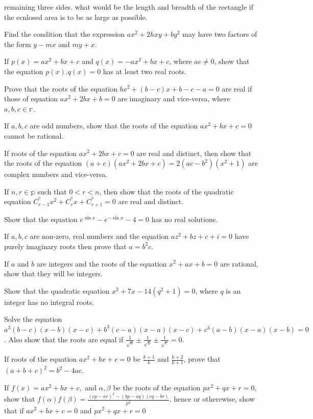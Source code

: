   remaining three sides. what would be the length and breadth of the rectangle if the ecnlosed area is to be as large as possible.
\item Find the condition that the expression $ax^2 + 2hxy + by^2$ may have two factors of the form $y - mx$ and $my + x$.
\item If $p(x) = ax^2 + bx + c$ and $q(x) = - ax^2 + bx + c$, where $ac\neq 0$, show that the equation $p(x).q(x) = 0$ has at least
  two real roots.
\item Prove that the roots of the equation $bx^2 + (b - c)x + b - c - a = 0$ are real if those of equation $ax^2 + 2bx + b = 0$ are
  imaginary and vice-versa, where $a, b, c\in\mathbb{r}$.
\item If $a, b, c$ are odd numbers, show that the roots of the equation $ax^2 + bx + c = 0$ cannot be rational.
\item If roots of the equation $ax^2 + 2bx + c = 0$ are real and distinct, then show that the roots of the equation $(a + c)(ax^2 +
  2bx + c) = 2(ac - b^2)(x^2 + 1)$ are complex numbers and vice-versa.
\item If $n, r\in\mathbb{p}$ such that $0 < r < n$, then show that the roots of the quadratic equation $C_{r - 1}^^nx^2 + C_r^^nx
  + C_{r + 1}^^n = 0$ are real and distinct.
\item Show that the equation $e^{\sin x} - e^{-\sin x} - 4 = 0$ has no real solutions.
\item If $a, b, c$ are non-zero, real numbers and the equation $az^2 + bz + c + i = 0$ have purely imaginary roots then prove that
  $a = b^2c$.
\item If $a$ and $b$ are integers and the roots of the equation $x^2 + ax + b = 0$ are rational, show that they will be integers.
\item Show that the quadratic equation $x^2 + 7x - 14(q^2 + 1) = 0$, where $q$ is an integer has no integral roots.
\item Solve the equation $a^3(b - c)(x - b)(x - c) + b^3(c - a)(x - a)(x - c) + c^3(a - b)(x - a)(x - b) = 0$. Also show that the
  roots are equal if $\frac{1}{\sqrt{a}}\pm \frac{1}{\sqrt{b}}\pm \frac{1}{\sqrt{c}} = 0$.
\item If roots of the equation $ax^2 + bx + c = 0$ be $\frac{k + 1}{k}$ and $\frac{k + 2}{k + 1}$, prove that $(a + b + c)^2 = b^2
  - 4ac$.
\item If $f(x) = ax^2 + bx + c,$ and $\alpha, \beta$ be the roots of the equation $px^2 + qx + r = 0$, show that $f(\alpha)f(\beta)
  = \frac{(cp - ar)^2 - (bp - aq)(cq - br)}{p^2}$. hence or otherewise, show that if $ax^2 + bx + c  = 0$ and $px^2 + qx + r = 0$
